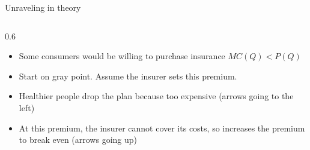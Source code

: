 \begin{frame}{Unraveling in theory}
\begin{columns}[T,onlytextwidth]
\begin{column}{0.6\textwidth}
\begin{itemize}
    \item Some consumers would be willing to purchase insurance $MC(Q) < P(Q)$
    \item Start on gray point. Assume the insurer sets this premium.
    \item Healthier people drop the plan because too expensive ({\color{red}arrows} going to the left)
    \item At this premium, the insurer cannot cover its costs, so increases the premium to break even ({\color{red}arrows} going up)
\end{itemize}
\end{column}
\end{columns}
\end{frame}
